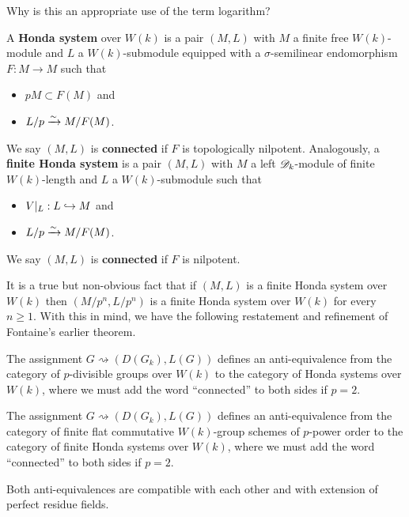 \documentclass[11pt]{article}
\newcommand{\D}{\ms{D}}
\newcommand{\func}{\rightsquigarrow}
\begin{document}
\begin{remark}
Why is this an appropriate use of the term logarithm?
\end{remark}

\begin{definition}
A \textbf{Honda system} over $W(k)$ is a pair $(M,L)$ with $M$ a finite free $W(k)$-module and $L$ a $W(k)$-submodule equipped with a $\sigma$-semilinear endomorphism $F: M\to M$ such that 
\begin{itemize}
\item $pM\subset F(M)$ and
\item $L/p\xrightarrow{\sim}M/F(M)$.
\end{itemize}
We say $(M,L)$ is \textbf{connected} if $F$ is topologically nilpotent. Analogously, a \textbf{finite Honda system} is a pair $(M,L)$ with $M$ a left $\D_k$-module of finite $W(k)$-length and $L$ a $W(k)$-submodule such that 
\begin{itemize}
\item $V|_L: L\hookrightarrow M$ and
\item $L/p\xrightarrow{\sim}M/F(M)$.
\end{itemize}
We say $(M,L)$ is \textbf{connected} if $F$ is nilpotent.
\end{definition}

It is a true but non-obvious fact that if $(M,L)$ is a finite Honda system over $W(k)$ then $(M/p^n,L/p^n)$ is a finite Honda system over $W(k)$ for every $n\geq1$. With this in mind, we have the following restatement and refinement of Fontaine's earlier theorem.

\begin{theorem}[Fontaine]
\hfill
\begin{enum}{\alph}
\item The assignment $G\func(D(G_k),L(G))$ defines an anti-equivalence from the category of $p$-divisible groups over $W(k)$ to the category of Honda systems over $W(k)$, where we must add the word ``connected'' to both sides if $p=2$.

\item The assignment $G\func(D(G_k),L(G))$ defines an anti-equivalence from the category of finite flat commutative $W(k)$-group schemes of $p$-power order to the category of finite Honda systems over $W(k)$, where we must add the word ``connected'' to both sides if $p=2$.

\item Both anti-equivalences are compatible with each other and with extension of perfect residue fields.
\end{enum}
\end{theorem}
\end{document}
